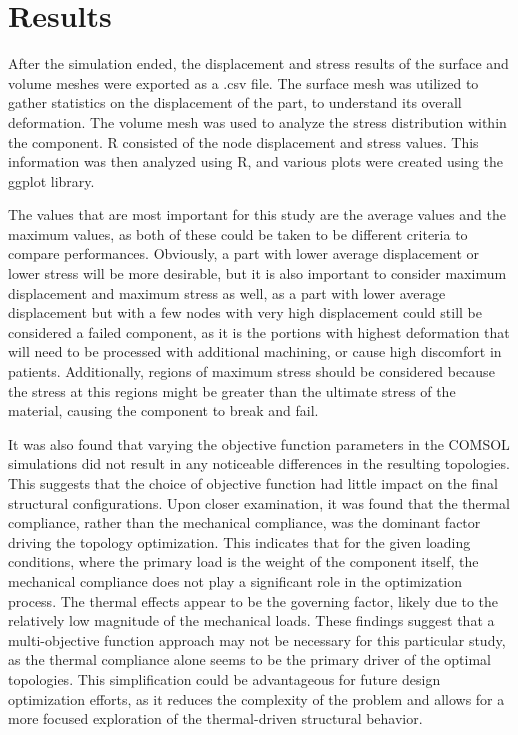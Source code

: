 \documentclass[../main.tex]{subfiles}
\begin{document}
\chapter{Results}

After the simulation ended, the displacement and stress results of the surface and volume meshes were exported as a .csv file. The surface mesh was utilized to gather statistics on the displacement of the part, to understand its overall deformation. The volume mesh was used to analyze the stress distribution within the component. R consisted of the node displacement and stress values. This information was then analyzed using R, and various plots were created using the ggplot library. 

The values that are most important for this study are the average values and the maximum values, as both of these could be taken to be different criteria to compare performances. Obviously, a part with lower average displacement or lower stress will be more desirable, but it is also important to consider maximum displacement and maximum stress as well, as a part with lower average displacement but with a few nodes with very high displacement could still be considered a failed component, as it is the portions with highest deformation that will need to be processed with additional machining, or cause high discomfort in patients. Additionally, regions of maximum stress should be considered because the stress at this regions might be greater than the ultimate stress of the material, causing the component to break and fail.

It was also found that varying the objective function parameters in the COMSOL simulations did not result in any noticeable differences in the resulting topologies. This suggests that the choice of objective function had little impact on the final structural configurations. Upon closer examination, it was found that the thermal compliance, rather than the mechanical compliance, was the dominant factor driving the topology optimization. This indicates that for the given loading conditions, where the primary load is the weight of the component itself, the mechanical compliance does not play a significant role in the optimization process. The thermal effects appear to be the governing factor, likely due to the relatively low magnitude of the mechanical loads. These findings suggest that a multi-objective function approach may not be necessary for this particular study, as the thermal compliance alone seems to be the primary driver of the optimal topologies. This simplification could be advantageous for future design optimization efforts, as it reduces the complexity of the problem and allows for a more focused exploration of the thermal-driven structural behavior.
\end{document}
